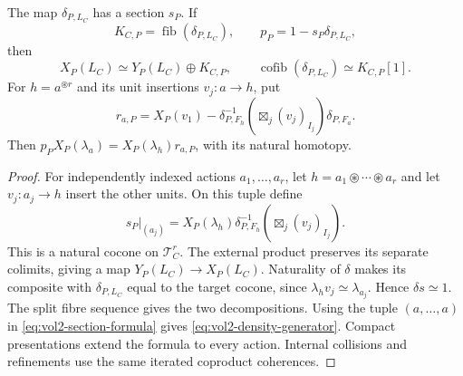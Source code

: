 \begin{proposition}\label{prop:vol2-density-section}
The map $\delta_{P,L_C}$ has a section $s_P$. If
\begin{equation}\label{eq:vol2-density-kernel}
 K_{C,P}=\operatorname{fib}(\delta_{P,L_C}),\qquad
 p_P=1-s_P\delta_{P,L_C},
\end{equation}
then
\[
 X_P(L_C)\simeq Y_P(L_C)\oplus K_{C,P},\qquad
 \operatorname{cofib}(\delta_{P,L_C})\simeq K_{C,P}[1].
\]
For $h=a^{\circledast r}$ and its unit insertions $v_j:a\to h$,
put
\begin{equation}\label{eq:vol2-density-generator}
 r_{a,P}=X_P(v_1)-\delta_{P,F_h}^{-1}
             \left(\boxtimes_j(v_j)_{I_j}\right)\delta_{P,F_a}.
\end{equation}
Then $p_PX_P(\lambda_a)=X_P(\lambda_h)r_{a,P}$,
with its natural homotopy.
\end{proposition}
\begin{proof}
For independently indexed actions $a_1,\ldots,a_r$, let
$h=a_1\circledast\cdots\circledast a_r$ and let
$v_j:a_j\to h$ insert the other units. On this tuple define
\begin{equation}\label{eq:vol2-section-formula}
 s_P\big|_{(a_j)}=X_P(\lambda_h)\delta_{P,F_h}^{-1}
                   \left(\boxtimes_j(v_j)_{I_j}\right).
\end{equation}
This is a natural cocone on $\mathscr T_C^r$. The external
product preserves its separate colimits, giving a map
$Y_P(L_C)\to X_P(L_C)$. Naturality of $\delta$ makes its
composite with $\delta_{P,L_C}$ equal to the target cocone,
since $\lambda_hv_j\simeq\lambda_{a_j}$. Hence $\delta s\simeq1$.
The split fibre sequence gives the two decompositions.
Using the tuple $(a,\ldots,a)$ in
\eqref{eq:vol2-section-formula} gives
\eqref{eq:vol2-density-generator}. Compact presentations
extend the formula to every action. Internal collisions
and refinements use the same iterated coproduct coherences.
\end{proof}

